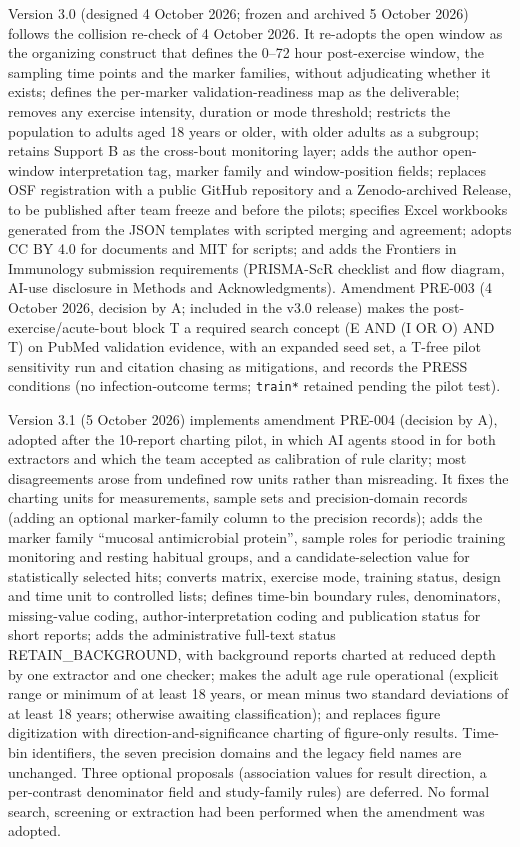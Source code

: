 \documentclass[
  11pt,
  a4paper,
]{article}
\begin{document}
Version 3.0 (designed 4 October 2026; frozen and archived 5 October
2026) follows the collision re-check of 4 October 2026. It re-adopts the
open window as the organizing construct that defines the 0--72 hour
post-exercise window, the sampling time points and the marker families,
without adjudicating whether it exists; defines the per-marker
validation-readiness map as the deliverable; removes any exercise
intensity, duration or mode threshold; restricts the population to
adults aged 18 years or older, with older adults as a subgroup; retains
Support B as the cross-bout monitoring layer; adds the author
open-window interpretation tag, marker family and window-position
fields; replaces OSF registration with a public GitHub repository and a
Zenodo-archived Release, to be published after team freeze and before
the pilots; specifies Excel workbooks generated from the JSON templates
with scripted merging and agreement; adopts CC BY 4.0 for documents and
MIT for scripts; and adds the Frontiers in Immunology submission
requirements (PRISMA-ScR checklist and flow diagram, AI-use disclosure
in Methods and Acknowledgments). Amendment PRE-003 (4 October 2026,
decision by A; included in the v3.0 release) makes the
post-exercise/acute-bout block T a required search concept (E AND (I OR
O) AND T) on PubMed validation evidence, with an expanded seed set, a
T-free pilot sensitivity run and citation chasing as mitigations, and
records the PRESS conditions (no infection-outcome terms;
\texttt{train*} retained pending the pilot test).

Version 3.1 (5 October 2026) implements amendment PRE-004 (decision by
A), adopted after the 10-report charting pilot, in which AI agents stood
in for both extractors and which the team accepted as calibration of
rule clarity; most disagreements arose from undefined row units rather
than misreading. It fixes the charting units for measurements, sample
sets and precision-domain records (adding an optional marker-family
column to the precision records); adds the marker family ``mucosal
antimicrobial protein'', sample roles for periodic training monitoring
and resting habitual groups, and a candidate-selection value for
statistically selected hits; converts matrix, exercise mode, training
status, design and time unit to controlled lists; defines time-bin
boundary rules, denominators, missing-value coding,
author-interpretation coding and publication status for short reports;
adds the administrative full-text status RETAIN\_BACKGROUND, with
background reports charted at reduced depth by one extractor and one
checker; makes the adult age rule operational (explicit range or minimum
of at least 18 years, or mean minus two standard deviations of at least
18 years; otherwise awaiting classification); and replaces figure
digitization with direction-and-significance charting of figure-only
results. Time-bin identifiers, the seven precision domains and the
legacy field names are unchanged. Three optional proposals (association
values for result direction, a per-contrast denominator field and
study-family rules) are deferred. No formal search, screening or
extraction had been performed when the amendment was adopted.
\end{document}
